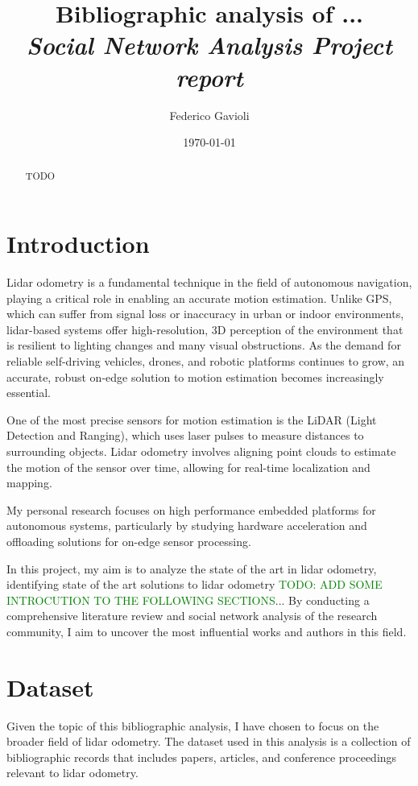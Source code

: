 \documentclass{article}
\title{\textbf{Bibliographic analysis of ...} \\ \textit{\normalsize{Social Network Analysis Project report}}}
\author{Federico Gavioli}
\affil{\textit{federico.gavioli@unimore.it}}
\date{\today}
\begin{document}
\maketitle

\begin{abstract}
TODO
\end{abstract}


\section{Introduction}
Lidar odometry is a fundamental technique in the field of autonomous navigation, playing a critical role in enabling an accurate motion estimation. Unlike GPS, which can suffer from signal loss or inaccuracy in urban or indoor environments, lidar-based systems offer high-resolution, 3D perception of the environment that is resilient to lighting changes and many visual obstructions. As the demand for reliable self-driving vehicles, drones, and robotic platforms continues to grow, an accurate, robust on-edge solution to motion estimation becomes increasingly essential.

One of the most precise sensors for motion estimation is the LiDAR (Light Detection and Ranging), which uses laser pulses to measure distances to surrounding objects. Lidar odometry involves aligning point clouds to estimate the motion of the sensor over time, allowing for real-time localization and mapping.

My personal research focuses on high performance embedded platforms for autonomous systems, particularly by studying hardware acceleration and offloading solutions for on-edge sensor processing.

In this project, my aim is to analyze the state of the art in lidar odometry, identifying state of the art solutions to lidar odometry \textcolor{green}{TODO: ADD SOME INTROCUTION TO THE FOLLOWING SECTIONS}... By conducting a comprehensive literature review and social network analysis of the research community, I aim to uncover the most influential works and authors in this field.



\section{Dataset}
Given the topic of this bibliographic analysis, I have chosen to focus on the broader field of lidar odometry. The dataset used in this analysis is a collection of bibliographic records that includes papers, articles, and conference proceedings relevant to lidar odometry.
\end{document}
